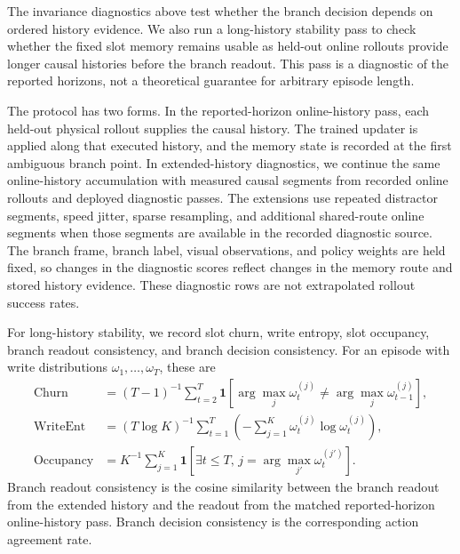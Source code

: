 \documentclass{article}
\begin{document}
The invariance diagnostics above test whether the branch decision depends on ordered history evidence. We also run a long-history stability pass to check whether the fixed slot memory remains usable as held-out online rollouts provide longer causal histories before the branch readout. This pass is a diagnostic of the reported horizons, not a theoretical guarantee for arbitrary episode length.

The protocol has two forms. In the reported-horizon online-history pass, each held-out physical rollout supplies the causal history. The trained updater is applied along that executed history, and the memory state is recorded at the first ambiguous branch point. In extended-history diagnostics, we continue the same online-history accumulation with measured causal segments from recorded online rollouts and deployed diagnostic passes. The extensions use repeated distractor segments, speed jitter, sparse resampling, and additional shared-route online segments when those segments are available in the recorded diagnostic source. The branch frame, branch label, visual observations, and policy weights are held fixed, so changes in the diagnostic scores reflect changes in the memory route and stored history evidence. These diagnostic rows are not extrapolated rollout success rates.

For long-history stability, we record slot churn, write entropy, slot occupancy, branch readout consistency, and branch decision consistency. For an episode with write distributions $\omega_1,\ldots,\omega_T$, these are
\begin{align}
    \mathrm{Churn}
    &=
    (T-1)^{-1}\sum_{t=2}^{T}
    \mathbf{1}\!\left[
    \arg\max_j \omega_t^{(j)}
    \neq
    \arg\max_j \omega_{t-1}^{(j)}
    \right],
    \\
    \mathrm{WriteEnt}
    &=
    (T\log K)^{-1}
    \sum_{t=1}^{T}
    \left(
    -\sum_{j=1}^{K}\omega_t^{(j)}\log\omega_t^{(j)}
    \right),
    \\
    \mathrm{Occupancy}
    &=
    K^{-1}
    \sum_{j=1}^{K}
    \mathbf{1}\!\left[
    \exists t\leq T,\,
    j=\arg\max_{j'}\omega_t^{(j')}
    \right].
    \label{eq:stability_metrics}
\end{align}
Branch readout consistency is the cosine similarity between the branch readout from the extended history and the readout from the matched reported-horizon online-history pass. Branch decision consistency is the corresponding action agreement rate.
\end{document}
